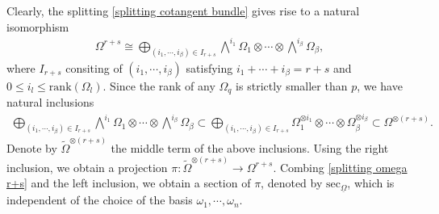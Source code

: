 \documentclass[12pt, a4paper]{article}
\begin{document}
Clearly, the splitting \eqref{splitting cotangent bundle} gives rise to a natural isomorphism
\begin{eqnarray}\label{splitting omega r+s}
\Omega^{r+s}\cong\bigoplus_{(i_1,\cdots,i_\beta)\in I_{r+s}}\bigwedge^{i_1}\Omega_1\otimes\cdots\otimes\bigwedge^{i_\beta}\Omega_\beta,
\end{eqnarray}
where $I_{r+s}$ consiting of $(i_1,\cdots,i_\beta)$ satisfying $i_1+\cdots+i_\beta=r+s$ and $0\leq i_l\leq\mathrm{rank}(\Omega_l)$. Since the rank of any $\Omega_q$ is strictly smaller than $p$, we have natural inclusions
\begin{eqnarray}\label{inclusion omega}
\bigoplus_{(i_1,\cdots,i_\beta)\in I_{r+s}}\bigwedge^{i_1}\Omega_1\otimes\cdots\otimes\bigwedge^{i_\beta}\Omega_\beta\subset\bigoplus_{(i_1,\cdots,i_\beta)\in I_{r+s}}\Omega_1^{\otimes i_1}\otimes\cdots\otimes\Omega_\beta^{\otimes i_\beta}\subset\Omega^{\otimes(r+s)}.
\end{eqnarray}
Denote by $\tilde\Omega^{\otimes(r+s)}$ the middle term of the above inclusions. Using the right inclusion, we obtain a projection $\pi:\tilde\Omega^{\otimes(r+s)}\to\Omega^{r+s}$. Combing \eqref{splitting omega r+s} and the left inclusion, we obtain a section of $\pi$, denoted by $\mathrm{sec}_{\underline\Omega}$, which is independent of the choice of the basis $\omega_1,\cdots,\omega_n$.
\end{document}
